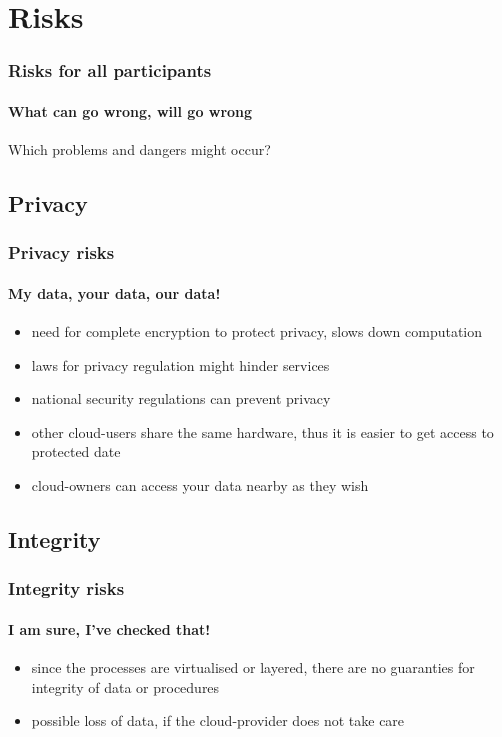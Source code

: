 \documentclass[]{beamer}
\begin{document}
\section{Risks}

\begin{frame}
        \frametitle{Risks for all participants}
        \framesubtitle{What can go wrong, will go wrong}
        Which problems and dangers might occur?
\end{frame}

\subsection{Privacy}

\begin{frame}
        \frametitle{Privacy risks}
        \framesubtitle{My data, your data, our data!}
        \begin{itemize}
                \item need for complete encryption to protect privacy, slows
                down computation
                \item laws for privacy regulation might hinder services
                \item national security regulations can prevent privacy
                \item other cloud-users share the same hardware, thus it is
                easier to get access to protected date
                \item cloud-owners can access your data nearby as they wish
        \end{itemize}
\end{frame}

\subsection{Integrity}

\begin{frame}
        \frametitle{Integrity risks}
        \framesubtitle{I am sure, I've checked that!}
        \begin{itemize}
                \item since the processes are virtualised or layered, there are
                no guaranties for integrity of data or procedures
                \item possible loss of data, if the cloud-provider does not take
                care
        \end{itemize}
\end{frame}
\end{document}
